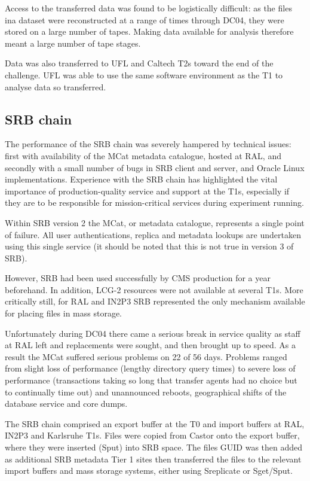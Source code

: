 \documentclass{cmspaper}
\begin{document}
Access to the transferred data was found to be logistically difficult: as the files ina  dataset were reconstructed at a range of times through DC04, they were stored on a large number of tapes. Making data available for analysis therefore meant a large number of tape stages.

Data was also transferred to UFL and Caltech T2s toward the end of the challenge. UFL was able to use the same software environment as the T1 to analyse data so transferred.

\subsection{SRB chain}
The performance of the SRB chain was severely hampered by technical
issues:
first with availability of the MCat metadata catalogue, hosted at RAL,
and
secondly with a small number of bugs in SRB client and server, and
Oracle
Linux implementations. Experience with the SRB chain has highlighted the
vital importance of production-quality service and support at the T1s, 
especially if they are to be responsible for mission-critical services
during 
experiment running.

Within SRB version 2 the MCat, or metadata catalogue, represents a
single point 
of failure. All user authentications, replica and metadata lookups are
undertaken 
using this single service (it should be noted that this is not true in
version 3 
of SRB). 

However, SRB had been used successfully by CMS production for a year
beforehand. 
In addition, LCG-2 resources were not available at several T1s. More
critically 
still, for RAL and IN2P3 SRB represented the only mechanism available
for placing 
files in mass storage.

Unfortunately during DC04 there came a serious break in service quality
as staff 
at RAL left and replacements were sought, and then brought up to speed.
As a result 
the MCat suffered serious problems on 22 of 56 days. Problems ranged
from slight 
loss of performance (lengthy directory query times) to severe loss of
performance 
(transactions taking so long that transfer agents had no choice but to
continually 
time out) and unannounced reboots, geographical shifts of the database
service and 
core dumps.

The SRB chain comprised an export buffer at the T0 and import buffers at
RAL, IN2P3 
and Karlsruhe T1s. Files were copied from Castor onto the export buffer,
where they 
were inserted (Sput) into SRB space. The files GUID was then added as
additional SRB 
metadata Tier 1 sites then transferred the files to the relevant import
buffers and 
mass storage systems, either using Sreplicate or Sget/Sput. 
\end{document}
